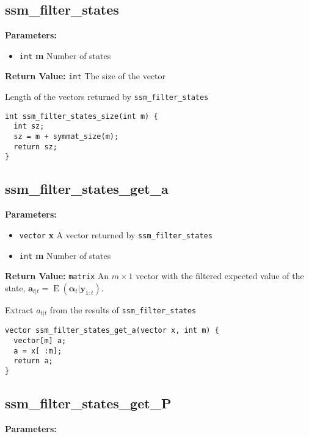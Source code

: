 \documentclass[]{book}
\providecommand{\tightlist}{%
  \setlength{\itemsep}{0pt}\setlength{\parskip}{0pt}}
\DeclareMathOperator{\E}{E}
\renewcommand{\vec}[1]{\boldsymbol{#1}}
\begin{document}
\subsection{ssm\_filter\_states}\label{ssmux5ffilterux5fstates}

\textbf{Parameters:}

\begin{itemize}
\tightlist
\item
  \texttt{int} \textbf{m} Number of states
\end{itemize}

\textbf{Return Value:} \texttt{int} The size of the vector

Length of the vectors returned by \texttt{ssm\_filter\_states}

\begin{verbatim}
int ssm_filter_states_size(int m) {
  int sz;
  sz = m + symmat_size(m);
  return sz;
}
\end{verbatim}

\subsection{ssm\_filter\_states\_get\_a}\label{ssmux5ffilterux5fstatesux5fgetux5fa}

\textbf{Parameters:}

\begin{itemize}
\tightlist
\item
  \texttt{vector} \textbf{x} A vector returned by
  \texttt{ssm\_filter\_states}
\item
  \texttt{int} \textbf{m} Number of states
\end{itemize}

\textbf{Return Value:} \texttt{matrix} An \(m \times 1\) vector with the
filtered expected value of the state,
\(\vec{a}_{t|t} = \E(\vec{\alpha}_t | \vec{y}_{1:t})\).

Extract \(a_{t|t}\) from the results of \texttt{ssm\_filter\_states}

\begin{verbatim}
vector ssm_filter_states_get_a(vector x, int m) {
  vector[m] a;
  a = x[ :m];
  return a;
}
\end{verbatim}

\subsection{ssm\_filter\_states\_get\_P}\label{ssmux5ffilterux5fstatesux5fgetux5fp}

\textbf{Parameters:}
\end{document}
